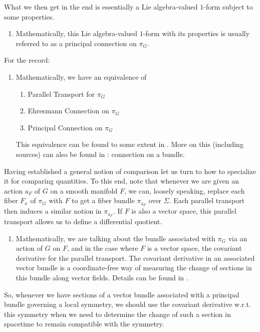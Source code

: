 \begin{enumerate}
What we then get in the end is essentially a Lie algebra-valued $1$-form subject to some properties.
\begin{enumerate}
\item[$\pmb{\hookrightarrow}$]
Mathematically, this Lie algebra-valued $1$-form with its properties is usually referred to as a principal connection on $\pi_{G}$.
\end{enumerate}
For the record:
\begin{enumerate}
\item[$\pmb{\hookrightarrow}$]
Mathematically, we have an equivalence of
\begin{enumerate}
\item[$\bullet$]
Parallel Transport for $\pi_{G}$
\item[$\bullet$]
Ehresmann Connection on $\pi_{G}$
\item[$\bullet$]
Principal Connection on $\pi_{G}$
\end{enumerate}
This equivalence can be found to some extent in \cite{797789bc}.
More on this (including sources) can also be found in \cite{wiki-nlab0000}: connection on a bundle.
\end{enumerate}
Having established a general notion of comparison let us turn to how to specialize it for comparing quantities.
To this end, note that whenever we are given an action $\mathrm{a}_{F}$ of $G$ on a smooth manifold $F$, we can, loosely speaking, replace each fiber $F_{x}$ of $\pi_{G}$ with $F$ to get a fiber bundle $\pi_{\mathrm{a}_{F}}$ over $\Sigma$.
Each parallel transport then induces a similar notion in $\pi_{\mathrm{a}_{F}}$.
If $F$ is also a vector space, this parallel transport allows us to define a differential quotient.
\begin{enumerate}
\item[$\pmb{\hookrightarrow}$]
Mathematically, we are talking about the bundle associated with $\pi_{G}$ via an action of $G$ on $F$, and in the case where $F$ is a vector space, the covariant derivative for the parallel transport.
The covariant derivative in an associated vector bundle is a coordinate-free way of measuring the change of sections in this bundle along vector fields.
Details can be found in \cite{797789bc}.
\end{enumerate}
So, whenever we have sections of a vector bundle associated with a principal bundle governing a local symmetry, we should use the covariant derivative w.r.t. this symmetry when we need to determine the change of such a section in spacetime to remain compatible with the symmetry.

\end{enumerate}
